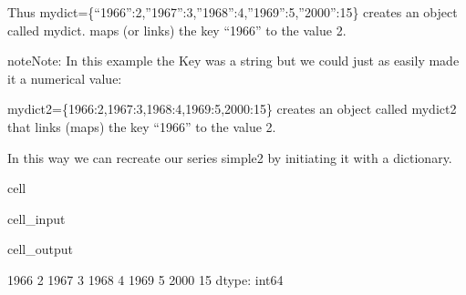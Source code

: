 \documentclass[letterpaper,10pt,english]{jupyterBook}
\begin{document}
\sphinxAtStartPar
Thus mydict=\{“1966”:2,”1967”:3,”1968”:4,”1969”:5,”2000”:\sphinxhyphen{}15\} creates an object called mydict.   maps (or links) the key “1966” to the value 2.

\begin{sphinxadmonition}{note}{Note:}
\sphinxAtStartPar
In this example the Key was a string but we could just as easily made it a numerical value:
\end{sphinxadmonition}

\sphinxAtStartPar
mydict2=\{1966:2,1967:3,1968:4,1969:5,2000:\sphinxhyphen{}15\} creates an object called mydict2 that links (maps) the key “1966” to the value 2.

\sphinxAtStartPar
In this way we can recreate our series simple2 by initiating it with a dictionary.

\begin{sphinxuseclass}{cell}\begin{sphinxVerbatimInput}

\begin{sphinxuseclass}{cell_input}
\begin{sphinxVerbatim}[commandchars=\\\{\}]
\end{sphinxVerbatim}

\end{sphinxuseclass}\end{sphinxVerbatimInput}
\begin{sphinxVerbatimOutput}

\begin{sphinxuseclass}{cell_output}
\begin{sphinxVerbatim}[commandchars=\\\{\}]
1966     2
1967     3
1968     4
1969     5
2000   \PYGZhy{}15
dtype: int64
\end{sphinxVerbatim}

\end{sphinxuseclass}\end{sphinxVerbatimOutput}

\end{sphinxuseclass}
\end{document}
